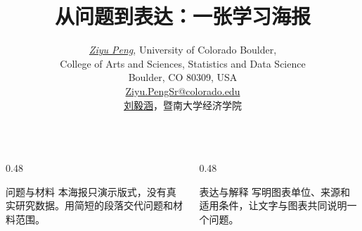 \documentclass{beamer}
\title{从问题到表达：一张学习海报}
\author[Ziyu Peng, 刘毅涵]{\href{https://github.com/pzy54154631-hub}{\textit{Ziyu Peng}}, University of Colorado Boulder,
  \texorpdfstring{\\[0.1em]}{ }College of Arts and Sciences, Statistics and Data Science
  \texorpdfstring{\\[0.1em]}{ }Boulder, CO 80309, USA
  \texorpdfstring{\\[0.1em]}{ }\href{mailto:Ziyu.PengSr@colorado.edu}{Ziyu.PengSr@colorado.edu}
  \texorpdfstring{\\[0.35em]}{; }
  \href{https://pzy54154631-hub.github.io/liuyihan/}{刘毅涵}，暨南大学经济学院}
\institute{LaTeX 学习手记 · 教学示例}
\begin{document}
\begin{frame}[t]
  \begin{center}
    {\LARGE\bfseries\inserttitle\par}
    \bigskip
    {\large\insertauthor\par}
    \medskip
    \insertinstitute
  \end{center}
  \vspace{1cm}
  \begin{columns}[t,totalwidth=\textwidth]
    \begin{column}{0.48\textwidth}
      \begin{block}{问题与材料}
        本海报只演示版式，没有真实研究数据。用简短的段落交代问题和材料范围。
      \end{block}
    \end{column}
    \begin{column}{0.48\textwidth}
      \begin{block}{表达与解释}
        写明图表单位、来源和适用条件，让文字与图表共同说明一个问题。
      \end{block}
    \end{column}
  \end{columns}
\end{frame}
\end{document}
